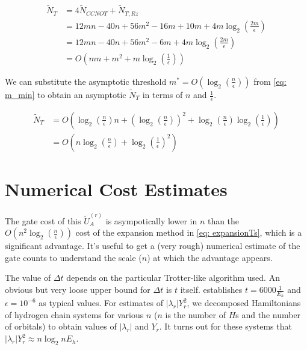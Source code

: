\begin{equation}
    \begin{split}
        \tilde{N}_{T} &= 4\tilde{N}_{CCNOT} + \tilde{N}_{T; Rz} \\
        &= 12mn - 40n + 56m^2 - 16m + 10m + 4m\log_2(\frac{2m}{\epsilon}) \\
        &= 12mn - 40n + 56m^2 - 6m + 4m\log_2(\frac{2m}{\epsilon}) \\
        &= O(mn + m^2 + m\log_2(\frac{1}{\epsilon})) \label{eq: Ts_mneps}
    \end{split}
\end{equation}

We can substitute the asymptotic threshold $m^* = O(\log_2(\frac{n}{\epsilon}))$ from \eqref{eq: m_min} to obtain an asymptotic $\tilde{N}_{T}$ in terms of $n$ and $\frac{1}{\epsilon}$.

\begin{equation}
    \begin{split}
        \tilde{N}_{T} &= O(\log_2(\frac{n}{\epsilon})n + (\log_2(\frac{n}{\epsilon}))^2 + \log_2(\frac{n}{\epsilon})\log_2(\frac{1}{\epsilon})) \\
        &= O(n\log_2(\frac{n}{\epsilon}) + \log_2(\frac{1}{\epsilon})^2) \label{eq: Ts_neps}
    \end{split}
\end{equation}

\section{Numerical Cost Estimates}

The gate cost of this $\tilde{U}_A^{(r)}$ is asympotically lower in $n$ than the $O(n^2\log_2(\frac{n}{\epsilon}))$ cost of the expansion method in \eqref{eq: expansionTs}, which is a significant advantage. It's useful to get a (very rough) numerical estimate of the gate counts to understand the scale ($n$) at which the advantage appears.

The value of $\Delta t$ depends on the particular Trotter-like algorithm used. An obvious but very loose upper bound for $\Delta t$ is $t$ itself. \cite{Gate_Count} establishes $t = 6000 \frac{1}{E_h}$ and $\epsilon = 10^{-6}$ as typical values. For estimates of $|\lambda_r|Y_r^2$, we decomposed Hamiltonians of hydrogen chain systems for various $n$ ($n$ is the number of $H$s and the number of orbitals) to obtain values of $|\lambda_r|$ and $Y_r$. It turns out for these systems that $|\lambda_r|Y_r^2 \approx n\log_2{n} E_h$.

